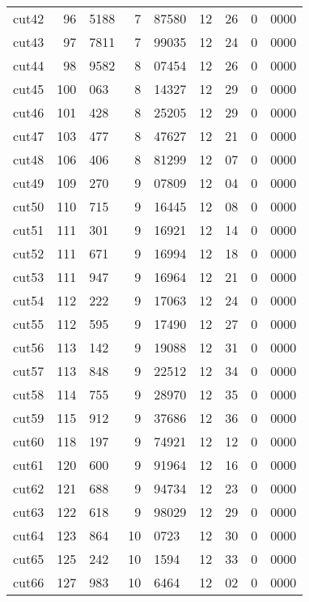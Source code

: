 \documentclass[11pt]{article}
\begin{document}
\begin{center}
\begin{tabular}{lr@{.}lr@{.}lr@{.}lr@{.}l}
cut42 &
  96&5188 &
    7&87580 &
      12&26 &
        0&0000 \\
cut43 &
  97&7811 &
    7&99035 &
      12&24 &
        0&0000 \\
cut44 &
  98&9582 &
    8&07454 &
      12&26 &
        0&0000 \\
cut45 &
  100&063 &
    8&14327 &
      12&29 &
        0&0000 \\
cut46 &
  101&428 &
    8&25205 &
      12&29 &
        0&0000 \\
cut47 &
  103&477 &
    8&47627 &
      12&21 &
        0&0000 \\
cut48 &
  106&406 &
    8&81299 &
      12&07 &
        0&0000 \\
cut49 &
  109&270 &
    9&07809 &
      12&04 &
        0&0000 \\
cut50 &
  110&715 &
    9&16445 &
      12&08 &
        0&0000 \\
cut51 &
  111&301 &
    9&16921 &
      12&14 &
        0&0000 \\
cut52 &
  111&671 &
    9&16994 &
      12&18 &
        0&0000 \\
cut53 &
  111&947 &
    9&16964 &
      12&21 &
        0&0000 \\
cut54 &
  112&222 &
    9&17063 &
      12&24 &
        0&0000 \\
cut55 &
  112&595 &
    9&17490 &
      12&27 &
        0&0000 \\
cut56 &
  113&142 &
    9&19088 &
      12&31 &
        0&0000 \\
cut57 &
  113&848 &
    9&22512 &
      12&34 &
        0&0000 \\
cut58 &
  114&755 &
    9&28970 &
      12&35 &
        0&0000 \\
cut59 &
  115&912 &
    9&37686 &
      12&36 &
        0&0000 \\
cut60 &
  118&197 &
    9&74921 &
      12&12 &
        0&0000 \\
cut61 &
  120&600 &
    9&91964 &
      12&16 &
        0&0000 \\
cut62 &
  121&688 &
    9&94734 &
      12&23 &
        0&0000 \\
cut63 &
  122&618 &
    9&98029 &
      12&29 &
        0&0000 \\
cut64 &
  123&864 &
    10&0723 &
      12&30 &
        0&0000 \\
cut65 &
  125&242 &
    10&1594 &
      12&33 &
        0&0000 \\
cut66 &
  127&983 &
    10&6464 &
      12&02 &
        0&0000 \\

\end{tabular}
\end{center}
\end{document}
